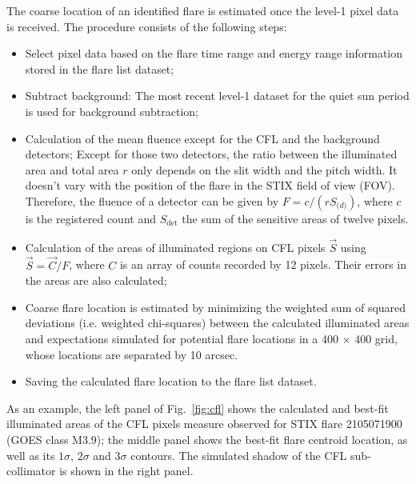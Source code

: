 \documentclass[referee]{aa} %
\begin{document}
The coarse location of an identified flare is estimated once the level-1 pixel data  is received.
The procedure consists of the following steps:
\begin{itemize}
  \item Select  pixel data based on the flare time range and energy range information stored in the flare list dataset;
  \item Subtract background: The most recent level-1 dataset for the quiet sun period is used for background subtraction;
  \item Calculation of the mean fluence except for the CFL and the background detectors; 
      Except for those two detectors, the ratio between the illuminated area and total area $r$ only depends on the 
      slit width and the pitch width. It doesn't vary with the position of the flare in the STIX field of view (FOV).  
      Therefore, the fluence of a detector can be given by $F=c/(r S_{\mathrm(d)})$,  where $c$ is the registered 
      count and $S_\textrm{det}$ the sum of the sensitive areas of twelve pixels. 
  \item Calculation of the areas of illuminated regions on CFL pixels $\vec{S}$ using $\vec{S} = \vec{C}/F$, where $C$  is an array of counts 
  recorded by 12 pixels. Their errors in the areas are also calculated; 
  \item  Coarse flare location is estimated by minimizing the weighted sum of squared deviations 
  (i.e. weighted chi-squares) between the calculated illuminated areas and expectations
  simulated for potential flare locations in a 400 $\times$ 400 grid, whose locations are separated by 10 arcsec.  
  \item Saving the calculated flare location to the flare list dataset. 
\end{itemize}
As an example, the left panel of Fig.~\ref{fig:cfl} shows the calculated and best-fit illuminated areas 
of the CFL pixels measure observed for STIX flare 2105071900 (GOES class M3.9);   the middle panel shows the best-fit 
flare centroid location, as well as its $1\sigma$, $2\sigma$ and $3\sigma$ contours. 
The simulated shadow of the CFL sub-collimator is shown in the right panel. 
\end{document}
